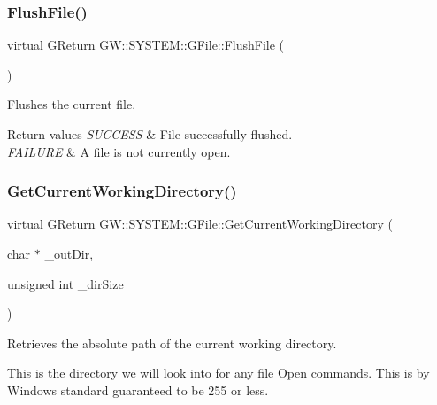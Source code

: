 \subsubsection{\texorpdfstring{Flush\+File()}{FlushFile()}}
{\footnotesize\ttfamily virtual \mbox{\hyperlink{namespace_g_w_a67a839e3df7ea8a5c5686613a7a3de21}{G\+Return}} G\+W\+::\+S\+Y\+S\+T\+E\+M\+::\+G\+File\+::\+Flush\+File (\begin{DoxyParamCaption}{ }\end{DoxyParamCaption})\hspace{0.3cm}{\ttfamily [pure virtual]}}



Flushes the current file. 


\begin{DoxyRetVals}{Return values}
{\em S\+U\+C\+C\+E\+SS} & File successfully flushed. \\
\hline
{\em F\+A\+I\+L\+U\+RE} & A file is not currently open. \\
\hline
\end{DoxyRetVals}
\mbox{\label{class_g_w_1_1_s_y_s_t_e_m_1_1_g_file_a6853b717e838d1b3a54f22449a37d764}} 
\subsubsection{\texorpdfstring{Get\+Current\+Working\+Directory()}{GetCurrentWorkingDirectory()}}
{\footnotesize\ttfamily virtual \mbox{\hyperlink{namespace_g_w_a67a839e3df7ea8a5c5686613a7a3de21}{G\+Return}} G\+W\+::\+S\+Y\+S\+T\+E\+M\+::\+G\+File\+::\+Get\+Current\+Working\+Directory (\begin{DoxyParamCaption}\item[{char $\ast$}]{\+\_\+out\+Dir,  }\item[{unsigned int}]{\+\_\+dir\+Size }\end{DoxyParamCaption})\hspace{0.3cm}{\ttfamily [pure virtual]}}



Retrieves the absolute path of the current working directory. 

This is the directory we will look into for any file Open commands. This is by Windows standard guaranteed to be 255 or less.


